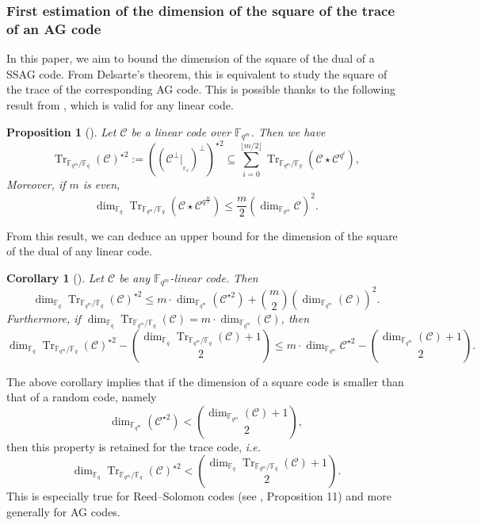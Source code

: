 \documentclass[a4paper]{amsart}
\newtheorem{proposition}[thm]{Proposition}
\newtheorem{coro}[thm]{Corollary}
\theoremstyle{definition}
\theoremstyle{remark}
\newcommand{\calC}{\mathcal{C}}
\newcommand{\fqm}{\mathbb{F}_{q^m}}
\newcommand{\fq}{\mathbb{F}_{q}}
\newcommand{\Tr}[1]{\operatorname{Tr}_{\mathbb{F}_{q^m}/\fq}\left(#1\right)}
\begin{document}
\subsubsection{First estimation of the dimension of the square of the trace of an AG code}

In this paper, we aim to bound the dimension of the square of the dual of a SSAG code. From Delsarte's theorem, this is equivalent to study the square of the trace of the corresponding AG code. 
This is possible thanks to the following result from \cite{MT21}, which is valid for any linear code.

\begin{proposition}[{\cite[Proposition~15]{MT21}}] \label{prop:Tr_BoundSchurSquare}
 Let $\calC$ be a linear code over $\fqm$. Then we have 
 \begin{equation} \label{eq:key_equation} \Tr{\calC}^{\star2} := ((\calC^{\perp}|_{_{{\mathbb{F}_q}}})^{\perp})^{\star2} \subseteq \sum\limits_{i=0}^{\lfloor{m/2} \rfloor} \Tr{\calC\star \calC^{q^i}},
 \end{equation}
Moreover, if $m$ is even, 
 \begin{equation} \label{eq:dim_m/2} \dim_{\fq} \Tr{\calC\star \calC^{q^{\frac{m}{2}}}} \leq \frac{m}{2} (\dim_{\fqm}\calC)^2.
\end{equation}
\end{proposition}
From this result, we can deduce an upper bound for the dimension of the square of the dual of any linear code.

\begin{coro} [{\cite[Corollary~16]{MT21}}]\label{coro:first_bound_square_of_trace}
 Let $\calC$ be any $\fqm$-linear code. Then 
 \begin{equation} \label{eq:mumford_bound}
  \dim_{\fq}\Tr{\calC}^{\star2} \leq m \cdot \dim_{\fqm}(\calC^{\star 2}) + \binom{m}{2} (\dim_{\fqm}(\calC))^2.
 \end{equation}
 Furthermore, if $\dim_{\fq} \Tr{\calC} = m \cdot \dim_{\fqm}(\calC)$, then 
 \[\dim_{\fq} \Tr{\calC}^{\star2} - \binom{\dim_{\fq} \Tr{\calC}+1}{2} \leq m \cdot \dim_{\fqm} \calC^{\star 2} - \binom{\dim_{\fqm} (\calC)+1}{2}.\]
 
 
\end{coro}
The above corollary implies that if the dimension of a square code is smaller than that of a random code, namely
\[ \dim_{\fqm} (\calC^{\star 2}) < \binom{\dim_{\fqm} (\calC)+1}{2},\]
then this property is retained for the trace code, \emph{i.e.}
\[\dim_{\fq} \Tr{\calC}^{\star 2} < \binom{\dim_{\fq} \Tr{\calC}+1}{2}.\]
This is especially true for Reed--Solomon codes (see \cite{MT21}, Proposition 11) and more generally for AG codes.
\end{document}
